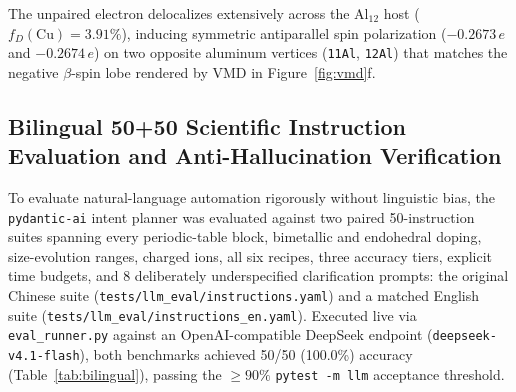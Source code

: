 \documentclass[journal=jcisd8,manuscript=article]{achemso}
\begin{document}
The unpaired electron delocalizes extensively across the $\mathrm{Al_{12}}$ host ($f_D(\mathrm{Cu}) = 3.91\%$), inducing symmetric antiparallel spin polarization ($-0.2673\,e$ and $-0.2674\,e$) on two opposite aluminum vertices (\texttt{11Al}, \texttt{12Al}) that matches the negative $\beta$-spin lobe rendered by VMD in Figure~\ref{fig:vmd}f.

\subsection{Bilingual 50+50 Scientific Instruction Evaluation and Anti-Hallucination Verification}

To evaluate natural-language automation rigorously without linguistic bias, the \texttt{pydantic-ai} intent planner was evaluated against two paired 50-instruction suites spanning every periodic-table block, bimetallic and endohedral doping, size-evolution ranges, charged ions, all six recipes, three accuracy tiers, explicit time budgets, and 8 deliberately underspecified clarification prompts: the original Chinese suite (\texttt{tests/llm\_eval/instructions.yaml}) and a matched English suite (\texttt{tests/llm\_eval/instructions\_en.yaml}). Executed live via \texttt{eval\_runner.py} against an OpenAI-compatible DeepSeek endpoint (\texttt{deepseek-v4.1-flash}), both benchmarks achieved 50/50 (100.0\%) accuracy (Table~\ref{tab:bilingual}), passing the $\ge 90\%$ \texttt{pytest -m llm} acceptance threshold.

\begin{table}[htbp]
  \centering
  \caption{Category-Level Bilingual Natural-Language-to-Plan Evaluation on \texttt{deepseek-v4.1-flash} (50 Chinese + 50 Matched English Scientific Instructions)}
  \label{tab:bilingual}
  \footnotesize
  \setlength{\tabcolsep}{4pt}
\end{table}
\end{document}
